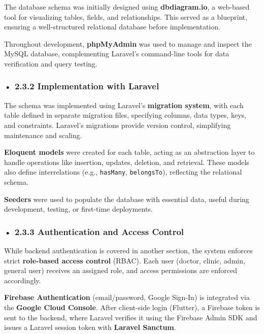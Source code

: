 \documentclass[12pt]{report}
\begin{document}
\noindent The database schema was initially designed using \textbf{dbdiagram.io}, a web-based tool for visualizing tables, fields, and relationships. This served as a blueprint, ensuring a well-structured relational database before implementation.

\noindent Throughout development, \textbf{phpMyAdmin} was used to manage and inspect the MySQL database, complementing Laravel’s command-line tools for data verification and query testing.

\vspace{0.5cm}

\subsubsection*{• 2.3.2 Implementation with Laravel}

The schema was implemented using Laravel’s \textbf{migration system}, with each table defined in separate migration files, specifying columns, data types, keys, and constraints. Laravel’s migrations provide version control, simplifying maintenance and scaling.

\noindent \textbf{Eloquent models} were created for each table, acting as an abstraction layer to handle operations like insertion, updates, deletion, and retrieval. These models also define interrelations (e.g., \texttt{hasMany}, \texttt{belongsTo}), reflecting the relational schema.

\noindent \textbf{Seeders} were used to populate the database with essential data, useful during development, testing, or first-time deployments.

\vspace{0.5cm}

\subsubsection*{• 2.3.3 Authentication and Access Control}

While backend authentication is covered in another section, the system enforces strict \textbf{role-based access control} (RBAC). Each user (doctor, clinic, admin, general user) receives an assigned role, and access permissions are enforced accordingly.

\noindent \textbf{Firebase Authentication} (email/password, Google Sign-In) is integrated via the \textbf{Google Cloud Console}. After client-side login (Flutter), a Firebase token is sent to the backend, where Laravel verifies it using the Firebase Admin SDK and issues a Laravel session token with \textbf{Laravel Sanctum}.
\end{document}
